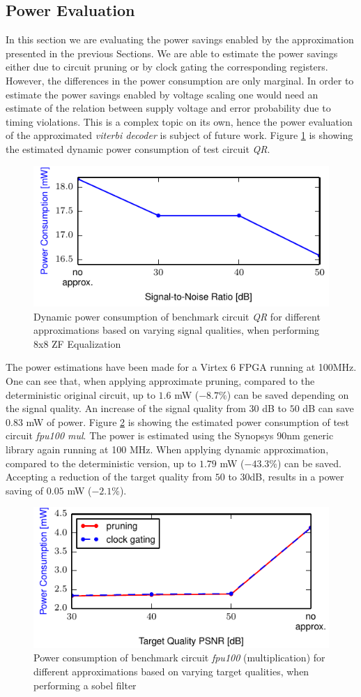\documentclass[conference]{IEEEtran}
\begin{document}
\subsection{Power Evaluation}
\label{subsec:power}
In this section we are evaluating the power savings enabled by the approximation presented in the previous Sections. We are able to estimate the power savings either due to circuit pruning or by clock gating the corresponding registers. However, the differences in the power consumption are only marginal. In order to estimate the power savings enabled by voltage scaling one would need an estimate of the relation between supply voltage and error probability due to timing violations. This is a complex topic on its own, hence the power evaluation of the approximated \emph{viterbi decoder} is subject of future work. Figure \ref{fig:power_qr} is showing the estimated dynamic power consumption of test circuit \emph{QR}. 
\begin{figure}[htb]
  \centering
  \includegraphics[width=.48\textwidth]{figs/power_qr}
  \caption{Dynamic power consumption of benchmark circuit \emph{QR} for different approximations based on varying signal qualities, when performing 8x8 ZF Equalization}
  \label{fig:power_qr}
\end{figure}
The power estimations have been made for a Virtex 6 FPGA running at 100MHz. One can see that, when applying approximate pruning, compared to the deterministic original circuit, up to $1.6$ mW ($-8.7\%$) can be saved depending on the signal quality. An increase of the signal quality from $30$ dB to $50$ dB can save $0.83$ mW of power.
Figure \ref{fig:power_fpu} is showing the estimated power consumption of test circuit \emph{fpu100 mul}. The power is estimated using the Synopsys 90nm generic library again running at 100 MHz. When applying dynamic approximation, compared to the deterministic version, up to $1.79$ mW ($-43.3\%$) can be saved. Accepting a reduction of the target quality from $50$ to $30$dB, results in a power saving of $0.05$ mW ($-2.1\%$).
\begin{figure}[htb]
  \centering
  \includegraphics[width=.48\textwidth]{figs/power_fpu}
  \caption{Power consumption of benchmark circuit \emph{fpu100} (multiplication) for different approximations based on varying target qualities, when performing a sobel filter}
  \label{fig:power_fpu}
\end{figure}
\end{document}
